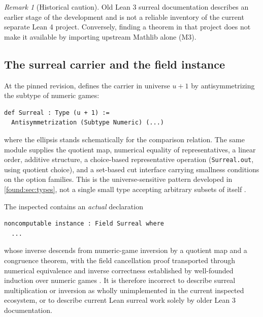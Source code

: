 \documentclass[11pt,letterpaper]{article}
\numberwithin{equation}{section}
\theoremstyle{definition}
\theoremstyle{remark}
\newtheorem{remark}[theorem]{Remark}
\begin{document}
\begin{remark}[Historical caution]\label{found:rem:lean3}
Old Lean 3 surreal documentation describes an earlier stage of the development
and is not a reliable inventory of the current separate Lean 4 project.
Conversely, finding a theorem in that project does not make it available by
importing upstream Mathlib alone (M3).
\end{remark}

\subsection{The surreal carrier and the field instance}
\label{found:sub:carrier}
At the pinned revision,  defines the
carrier in universe $u+1$ by antisymmetrizing the subtype of numeric games:
\begin{samepage}
\begin{lstlisting}
def Surreal : Type (u + 1) :=
  Antisymmetrization (Subtype Numeric) (...)
\end{lstlisting}
\end{samepage}
where the ellipsis stands schematically for the comparison relation. The same
module supplies the quotient map, numerical equality of representatives, a
linear order, additive structure, a choice-based representative operation
(\texttt{Surreal.out}, using quotient choice), and a set-based cut interface
carrying smallness conditions on the option families. This is the
universe-sensitive pattern developed in \cref{found:sec:types}, not a single
small type accepting arbitrary subsets of itself
\cite{found:GamesBasic}.

The inspected  contains an
\emph{actual} declaration
\begin{samepage}
\begin{lstlisting}
noncomputable instance : Field Surreal where
  ...
\end{lstlisting}
\end{samepage}
whose inverse descends from numeric-game inversion by a quotient map and a
congruence theorem, with the field cancellation proof transported through
numerical equivalence and inverse correctness established by well-founded
induction over numeric games \cite{found:GamesDivision}. It is therefore
incorrect to describe surreal multiplication or inversion as wholly
unimplemented in the current inspected ecosystem, or to describe current Lean
surreal work solely by older Lean 3 documentation.
\end{document}
